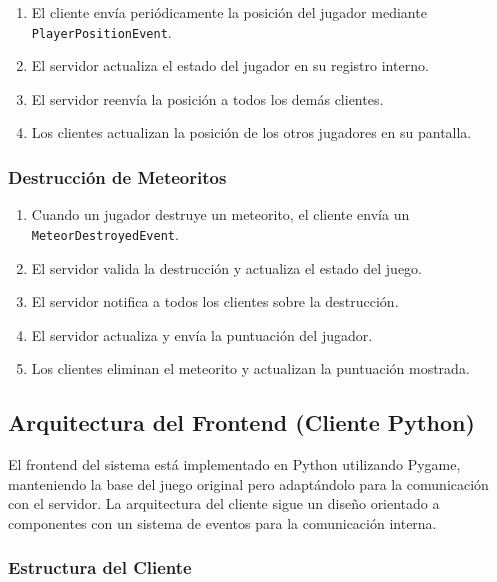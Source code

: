 \documentclass[12pt,letterpaper]{article}
\begin{document}
\begin{enumerate}
    \item El cliente envía periódicamente la posición del jugador mediante \texttt{PlayerPositionEvent}.
    \item El servidor actualiza el estado del jugador en su registro interno.
    \item El servidor reenvía la posición a todos los demás clientes.
    \item Los clientes actualizan la posición de los otros jugadores en su pantalla.
\end{enumerate}

\subsubsection{Destrucción de Meteoritos}

\begin{enumerate}
    \item Cuando un jugador destruye un meteorito, el cliente envía un \texttt{MeteorDestroyedEvent}.
    \item El servidor valida la destrucción y actualiza el estado del juego.
    \item El servidor notifica a todos los clientes sobre la destrucción.
    \item El servidor actualiza y envía la puntuación del jugador.
    \item Los clientes eliminan el meteorito y actualizan la puntuación mostrada.
\end{enumerate}

\subsection{Arquitectura del Frontend (Cliente Python)}

El frontend del sistema está implementado en Python utilizando Pygame, manteniendo la base del juego original pero adaptándolo para la comunicación con el servidor. La arquitectura del cliente sigue un diseño orientado a componentes con un sistema de eventos para la comunicación interna.

\subsubsection{Estructura del Cliente}
\end{document}
